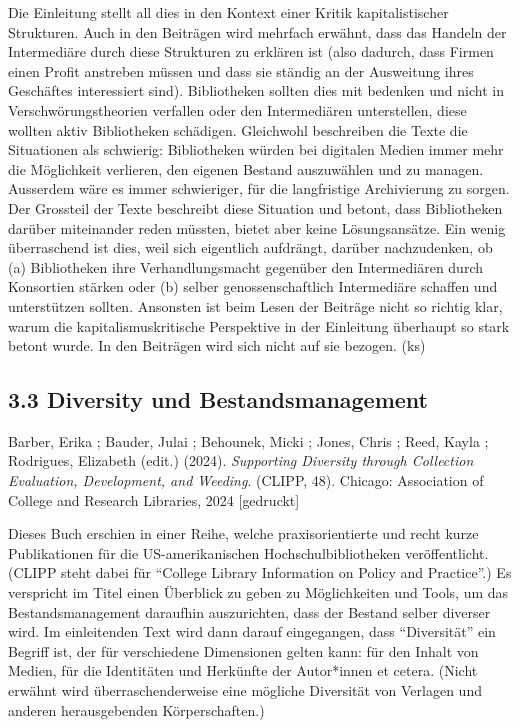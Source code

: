 \documentclass[a4paper,
fontsize=11pt,
oneside,
numbers=noperiodatend,
parskip=half-,
bibliography=totoc,
final
]{scrartcl}
\begin{document}
Die Einleitung stellt all dies in den Kontext einer Kritik
kapitalistischer Strukturen. Auch in den Beiträgen wird mehrfach
erwähnt, dass das Handeln der Intermediäre durch diese Strukturen zu
erklären ist (also dadurch, dass Firmen einen Profit anstreben müssen
und dass sie ständig an der Ausweitung ihres Geschäftes interessiert
sind). Bibliotheken sollten dies mit bedenken und nicht in
Verschwörungstheorien verfallen oder den Intermediären unterstellen,
diese wollten aktiv Bibliotheken schädigen. Gleichwohl beschreiben die
Texte die Situationen als schwierig: Bibliotheken würden bei digitalen
Medien immer mehr die Möglichkeit verlieren, den eigenen Bestand
auszuwählen und zu managen. Ausserdem wäre es immer schwieriger, für die
langfristige Archivierung zu sorgen. Der Grossteil der Texte beschreibt
diese Situation und betont, dass Bibliotheken darüber miteinander reden
müssten, bietet aber keine Lösungsansätze. Ein wenig überraschend ist
dies, weil sich eigentlich aufdrängt, darüber nachzudenken, ob (a)
Bibliotheken ihre Verhandlungsmacht gegenüber den Intermediären durch
Konsortien stärken oder (b) selber genossenschaftlich Intermediäre
schaffen und unterstützen sollten. Ansonsten ist beim Lesen der Beiträge
nicht so richtig klar, warum die kapitalismuskritische Perspektive in
der Einleitung überhaupt so stark betont wurde. In den Beiträgen wird
sich nicht auf sie bezogen. (ks)

\subsection{3.3 Diversity und
Bestandsmanagement}\label{diversity-und-bestandsmanagement}

Barber, Erika ; Bauder, Julai ; Behounek, Micki ; Jones, Chris ; Reed,
Kayla ; Rodrigues, Elizabeth (edit.) (2024). \emph{Supporting Diversity
through Collection Evaluation, Development, and Weeding}. (CLIPP, 48).
Chicago: Association of College and Research Libraries, 2024
{[}gedruckt{]}

Dieses Buch erschien in einer Reihe, welche praxisorientierte und recht
kurze Publikationen für die US-amerikanischen Hochschulbibliotheken
veröffentlicht. (CLIPP steht dabei für \enquote{College Library
Information on Policy and Practice}.) Es verspricht im Titel einen
Überblick zu geben zu Möglichkeiten und Tools, um das Bestandsmanagement
daraufhin auszurichten, dass der Bestand selber diverser wird. Im
einleitenden Text wird dann darauf eingegangen, dass
\enquote{Diversität} ein Begriff ist, der für verschiedene Dimensionen
gelten kann: für den Inhalt von Medien, für die Identitäten und
Herkünfte der Autor*innen et cetera. (Nicht erwähnt wird
überraschenderweise eine mögliche Diversität von Verlagen und anderen
herausgebenden Körperschaften.)
\end{document}
